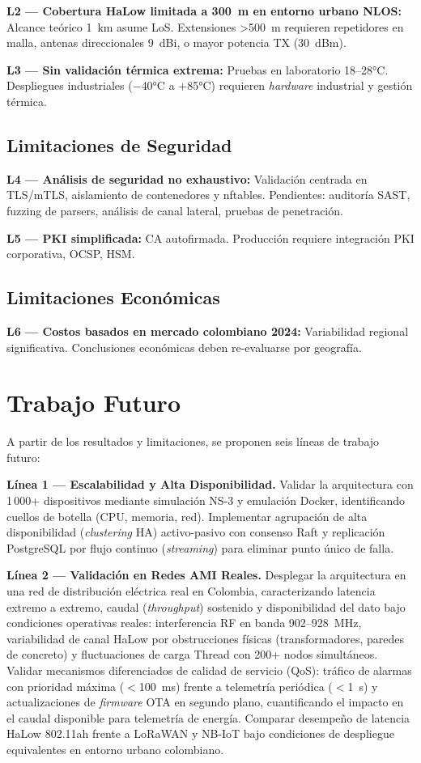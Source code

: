 \textbf{L2 --- Cobertura HaLow limitada a 300~m en entorno urbano NLOS:} Alcance teórico 1~km asume LoS. Extensiones >500~m requieren repetidores en malla, antenas direccionales 9~dBi, o mayor potencia TX (30~dBm).

\textbf{L3 --- Sin validación térmica extrema:} Pruebas en laboratorio 18--28°C. Despliegues industriales ($-$40°C a +85°C) requieren \emph{hardware} industrial y gestión térmica.

\subsection{Limitaciones de Seguridad}

\textbf{L4 --- Análisis de seguridad no exhaustivo:} Validación centrada en TLS/mTLS, aislamiento de contenedores y nftables. Pendientes: auditoría SAST, fuzzing de parsers, análisis de canal lateral, pruebas de penetración.

\textbf{L5 --- PKI simplificada:} CA autofirmada. Producción requiere integración PKI corporativa, OCSP, HSM.

\subsection{Limitaciones Económicas}

\textbf{L6 --- Costos basados en mercado colombiano 2024:} Variabilidad regional significativa. Conclusiones económicas deben re-evaluarse por geografía.

\section{Trabajo Futuro}

A partir de los resultados y limitaciones, se proponen seis líneas de trabajo futuro:

\textbf{Línea 1 --- Escalabilidad y Alta Disponibilidad.} Validar la arquitectura con 1\,000+ dispositivos mediante simulación NS-3 y emulación Docker, identificando cuellos de botella (CPU, memoria, red). Implementar agrupación de alta disponibilidad (\emph{clustering} HA) activo-pasivo con consenso Raft y replicación PostgreSQL por flujo continuo (\emph{streaming}) para eliminar punto único de falla.

\textbf{Línea 2 --- Validación en Redes AMI Reales.} Desplegar la arquitectura en una red de distribución eléctrica real en Colombia, caracterizando latencia extremo a extremo, caudal (\textit{throughput}) sostenido y disponibilidad del dato bajo condiciones operativas reales: interferencia RF en banda 902--928~MHz, variabilidad de canal HaLow por obstrucciones físicas (transformadores, paredes de concreto) y fluctuaciones de carga Thread con 200+ nodos simultáneos. Validar mecanismos diferenciados de calidad de servicio (QoS): tráfico de alarmas con prioridad máxima ($<$100~ms) frente a telemetría periódica ($<$1~s) y actualizaciones de \textit{firmware} OTA en segundo plano, cuantificando el impacto en el caudal disponible para telemetría de energía. Comparar desempeño de latencia HaLow 802.11ah frente a LoRaWAN y NB-IoT bajo condiciones de despliegue equivalentes en entorno urbano colombiano.

